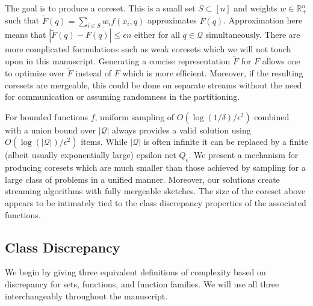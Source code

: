 \documentclass[anon,12pt]{colt2019} %
\newcommand{\R}{\mathbb{R}}
\newcommand{\eps}{\epsilon}
\begin{document}
The goal is to produce a coreset. This is a small set $S\subset [n]$ and weights $w \in\R_+^{n}$ such that $\tilde F(q) = \sum_{i \in S} w_i f(x_i,q)$ approximates $F(q)$.
Approximation here means that $|\tilde F(q)  - F(q)| \le \eps n$ either for all $q \in \mathcal Q$ simultaneously. %
There are more complicated formulations such as weak coresets which we will not touch upon in this manuscript. 
Generating a concise representation $\tilde F$ for $F$ allows one to optimize over $\tilde F$ instead of $F$ which is more efficient. 
Moreover, if the resulting coresets are mergeable, this could be done on separate streams without the need for communication or assuming randomness in the partitioning.

For bounded functions $f$, uniform sampling of $O(\log(1/\delta)/\eps^2)$ combined with a union bound over $|\mathcal Q|$ always provides a valid solution using $O(\log(|\mathcal Q|)/\eps^2)$ items. 
While $|\mathcal Q|$ is often infinite it can be replaced by a finite (albeit usually exponentially large) epsilon net $Q_\eps$. 
%
We present a mechanism for producing coresets which are much smaller than those achieved by sampling for a large class of problems in a unified manner.  
Moreover, our solutions create streaming algorithms with fully mergeable sketches. 
The size of the coreset above appears to be intimately tied to the class discrepancy properties of the associated functions.


\subsection{Class Discrepancy}
We begin by giving three equivalent definitions of complexity based on discrepancy for sets, functions, and function families. We will use all three interchangeably throughout the manuscript.
\end{document}
